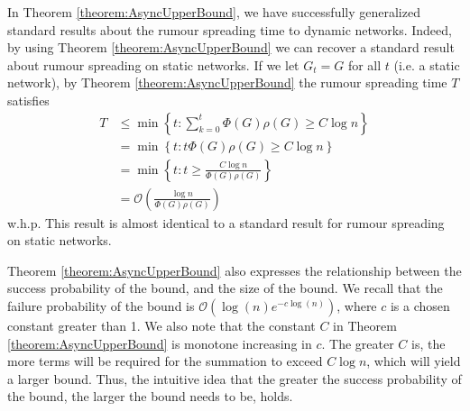 In Theorem \ref{theorem:AsyncUpperBound}, we have successfully generalized standard results about the rumour spreading time to dynamic networks. Indeed, by using Theorem \ref{theorem:AsyncUpperBound} we can recover a standard result about rumour spreading on static networks. If we let $G_t = G$ for all $t$ (i.e. a static network), by Theorem \ref{theorem:AsyncUpperBound} the rumour spreading time $T$ satisfies 
\begin{align*}
	T &\leq \min \left\{t : \sum_{k=0}^t \Phi(G)\rho(G) \geq C \log n \right\} \\
	&= \min \left\{t : t \Phi(G)\rho(G) \geq C \log n \right\}  \\
	&= \min \left\{t : t \geq \frac{C \log n}{\Phi(G)\rho(G)}\right\}  \\
	&= \mathcal{O}\left(\frac{\log n}{\Phi(G)\rho(G)}\right)
\end{align*}
w.h.p. This result is almost identical to a standard result for rumour spreading on static networks.  %


Theorem \ref{theorem:AsyncUpperBound} also expresses the relationship between the success probability of the bound, and the size of the bound. We recall that the failure probability of the bound is $\mathcal{O}\left(\log(n) e^{-c \log(n)}\right)$, where $c$ is a chosen constant greater than 1. %
We also note that the constant $C$ in Theorem \ref{theorem:AsyncUpperBound} is monotone increasing in $c$. The greater $C$ is, the more terms will be required for the summation to exceed $C \log n$, which will yield a larger bound. 
Thus, the intuitive idea that the greater the success probability of the bound, the larger the bound needs to be, holds. %




 

